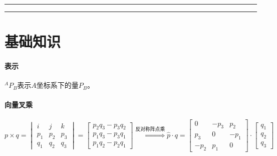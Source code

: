 \documentclass[
12pt, %
a4paper, 
oneside, %
headinclude,footinclude, %
]{scrartcl}
\title{\normalfont\spacedallcaps{机器人学导论}}
\date{}
\begin{document}
\maketitle
\newpage
\hypertarget{toc}{}
\begingroup
\begin{multicols}{2}
\tableofcontents
\end{multicols}
\endgroup
\hrule
\begingroup
\begin{multicols}{2}
\listoffigures
\end{multicols}
\endgroup
\hrule
\begingroup
\begin{multicols}{2}
\listoftables
\end{multicols}
\endgroup
\newpage
\begingroup
\begin{multicols}{2}
\listoftips
\end{multicols}
\endgroup
\newpage
\section{基础知识}
\paragraph{表示}
$ {}^A P_B $表示$ A $坐标系下的量$ P_B $。
\paragraph{向量叉乘}
$$
p \times q = \begin{vmatrix} i & j & k \\ p_1 & p_2 & p_3 \\ q_1 & q_2 & q_3 \end{vmatrix} = \begin{bmatrix} p_2 q_3 - p_3 q_2 \\ p_1 q_3 - p_3 q_1 \\ p_1 q_2 - p_2 q_1 \end{bmatrix}
\overset{\text{反对称阵点乘}}{\Longrightarrow}
\hat{p} \cdot q = \begin{bmatrix} 0 & -p_3 & p_2 \\ p_3 & 0 & -p_1 \\ -p_2 & p_1 & 0 \end{bmatrix} \cdot \begin{bmatrix} q_1 \\ q_2 \\ q_3 \end{bmatrix}
$$
\end{document}
